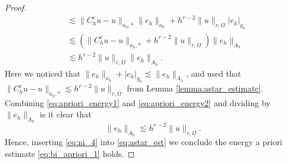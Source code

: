 \documentclass[11pt]{article}
\theoremstyle{remark}
\newcommand{\abs}[1]{\left\lvert #1 \right\rvert}
\numberwithin{equation}{section}
\begin{document}
\begin{proof}
\begin{equation}
\begin{split}
         &\lesssim \| C _{h}^{e} u - u \|_{a_{h},*  }^{  } \| e_{h} \|_{a_{h}  }^{  } + h^{r-2} \| u \|_{r, \Omega   }^{  }\abs{e_{h}  }_{g_{h}} \\
         &\lesssim (\| C _{h}^{e} u - u \|_{a_{h},*  }^{  } + h^{r-2} \| u \|_{r, \Omega   }^{  }) \|e_{h}\|_{A_{h}} \\
         &\lesssim  h^{r-2} \| u \|_{r, \Omega   }^{  } \|e_{h}\|_{A_{h}}.
    \end{split}
\end{equation}
Here we noticed that $\| e_{h} \|_{a_{h}  }^{  } + \abs{e_{h}  }_{g_{h}} \lesssim \| e_{h} \|_{ A_{h} }^{  }  $, and used that $\| C _{h}^{e} u - u \|_{a_{h},*  }^{  } \lesssim h^{r-2}\| u \|_{ r,\Omega  }^{  }  $ from Lemma
\ref{lemma:astar_estimate}. Combining \eqref{eq:apriori_energy1} and \eqref{eq:apriori_energy2} and dividing by $\| e_{h} \|_{ A_{h} }^{  } $  is it clear that
\begin{equation}
    \label{eq:ni_4}
\| e_{h} \|_{ A_{h}  }^{  } \lesssim h^{r-2} \| u \|_{r, \Omega   }^{  }  .
\end{equation}
Hence, inserting \eqref{eq:ni_4} into \eqref{eq:astar_est} we conclude the energy a priori estimate \eqref{eq:bi_apriori_1} holds.


\end{proof}
\end{document}
